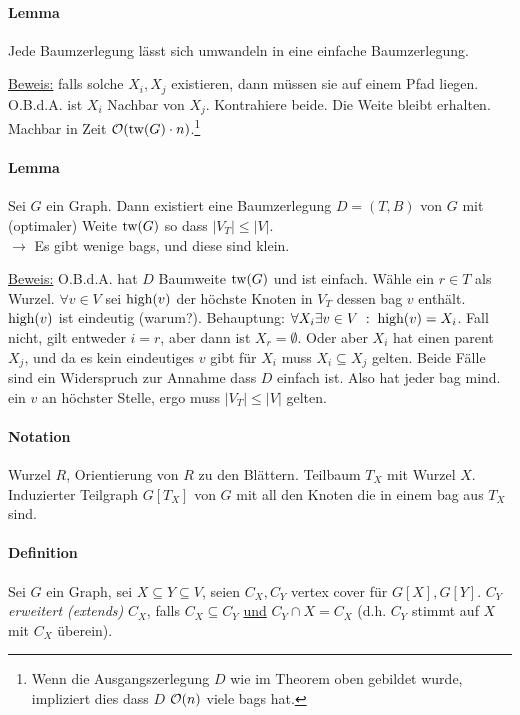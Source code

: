 \paragraph{Lemma}
Jede Baumzerlegung lässt sich umwandeln in eine einfache Baumzerlegung.

\underline{Beweis:}
falls solche $X_i, X_j$ existieren, dann müssen sie auf einem Pfad liegen.
O.B.d.A. ist $X_i$ Nachbar von $X_j$. Kontrahiere beide.
Die Weite bleibt erhalten.
Machbar in Zeit $\mathcal{O}(\text{tw}(G) \cdot n)$.\footnote{Wenn die Ausgangszerlegung $D$ wie im Theorem oben gebildet wurde,
impliziert dies dass $D$ $\mathcal{O}(n)$ viele bags hat.}

\paragraph{Lemma}
Sei $G$ ein Graph.
Dann existiert eine Baumzerlegung $D=(T,B)$ von $G$ mit (optimaler) Weite $\text{tw}(G)$ so dass $|V_T| \leq |V|$. \\
$\longrightarrow$ Es gibt wenige bags, und diese sind klein.

\underline{Beweis:}
O.B.d.A. hat $D$ Baumweite $\text{tw}(G)$ und ist einfach. Wähle ein $r \in T$ als Wurzel.
$\forall v \in V$ sei $\text{high}(v)$ der höchste Knoten in $V_T$ dessen bag $v$ enthält.
$\text{high}(v)$ ist eindeutig (warum?).
Behauptung: $\forall X_i \exists v \in V \; : \; \text{high}(v) = X_i$.
Fall nicht, gilt entweder $i = r$, aber dann ist $X_r = \emptyset$.
Oder aber $X_i$ hat einen parent $X_j$, und da es kein eindeutiges $v$ gibt für $X_i$ muss $X_i \subseteq X_j$ gelten.
Beide Fälle sind ein Widerspruch zur Annahme dass $D$ einfach ist.
Also hat jeder bag mind. ein $v$ an höchster Stelle, ergo muss $|V_T| \leq |V|$ gelten.

\paragraph{Notation}
Wurzel $R$, Orientierung von $R$ zu den Blättern.
Teilbaum $T_X$ mit Wurzel $X$.
Induzierter Teilgraph $G[T_X]$ von $G$ mit all den Knoten die in einem bag aus $T_X$ sind.

\paragraph{Definition}
Sei $G$ ein Graph, sei $X \subseteq Y \subseteq V $, seien $C_X, C_Y$ vertex cover für $G[X], G[Y]$.
$C_Y$ \emph{erweitert (extends)} $C_X$, falls $C_X \subseteq C_Y$ \underline{und} $C_Y \cap X = C_X$
(d.h. $C_Y$ stimmt auf $X$ mit $C_X$ überein).

